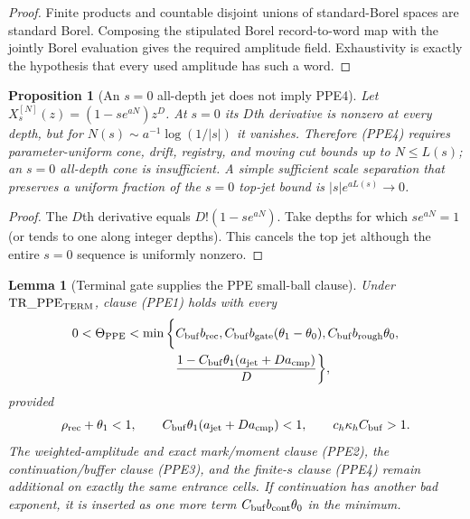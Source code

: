 \documentclass[11pt]{article}
\newtheorem{proposition}[theorem]{Proposition}
\newtheorem{lemma}[theorem]{Lemma}
\begin{document}
\begin{proof}
Finite products and countable disjoint unions of standard-Borel spaces are
standard Borel.  Composing the stipulated Borel record-to-word map with the
jointly Borel evaluation gives the required amplitude field.  Exhaustivity
is exactly the hypothesis that every used amplitude has such a word.
\end{proof}

\begin{proposition}[An $s=0$ all-depth jet does not imply PPE4]
\label{prop:translation-PPE4-parameter-countermodel}
Let $X_s^{[N]}(z)=(1-se^{aN})z^D$.  At $s=0$ its $D$th derivative is nonzero
at every depth, but for $N(s)\sim a^{-1}\log(1/|s|)$ it vanishes.  Therefore
\textup{(PPE4)} requires parameter-uniform cone, drift, registry, and moving
cut bounds up to $N\le L(s)$; an $s=0$ all-depth cone is insufficient.  A
simple sufficient scale separation that preserves a uniform fraction of the
$s=0$ top-jet bound is
$|s|e^{aL(s)}\to0$.
\end{proposition}

\begin{proof}
The $D$th derivative equals $D!(1-se^{aN})$.  Take depths for which
$se^{aN}=1$ (or tends to one along integer depths).  This cancels the top
jet although the entire $s=0$ sequence is uniformly nonzero.
\end{proof}

\begin{lemma}[Terminal gate supplies the PPE small-ball clause]
\label{lem:translation-terminal-implies-ppe}
Under $\mathrm{TR\_PPE}_{\rm TERM}$, clause \textup{(PPE1)} holds with
every
\begin{equation}
\label{eq:translation-terminal-ppe-exponent}
\begin{split}
0<\Theta_{\rm PPE}<\min\bigg\{&C_{\rm buf}b_{\rm rec},
 C_{\rm buf}b_{\rm gate}(\theta_1-\theta_0),
 C_{\rm buf}b_{\rm rough}\theta_0,\\
 &\frac{1-C_{\rm buf}\theta_1
 (a_{\rm jet}+Da_{\rm cmp})}{D}\bigg\},
\end{split}
\end{equation}
provided
\begin{equation}
\label{eq:translation-terminal-positive-window}
 \rho_{\rm rec}+\theta_1<1,\qquad
 C_{\rm buf}\theta_1(a_{\rm jet}+Da_{\rm cmp})<1,
 \qquad c_h\kappa_hC_{\rm buf}>1.
\end{equation}
The weighted-amplitude and exact mark/moment clause \textup{(PPE2)}, the
continuation/buffer clause \textup{(PPE3)}, and the finite-$s$ clause
\textup{(PPE4)} remain additional on exactly the same entrance cells.  If
continuation has another bad exponent, it is inserted as one more
term $C_{\rm buf}b_{\rm cont}\theta_0$ in the minimum.
\end{lemma}
\end{document}
